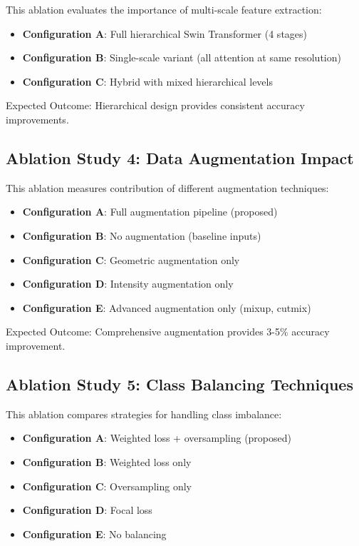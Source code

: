 This ablation evaluates the importance of multi-scale feature extraction:

\begin{itemize}
    \item \textbf{Configuration A}: Full hierarchical Swin Transformer (4 stages)
    \item \textbf{Configuration B}: Single-scale variant (all attention at same resolution)
    \item \textbf{Configuration C}: Hybrid with mixed hierarchical levels
\end{itemize}

Expected Outcome: Hierarchical design provides consistent accuracy improvements.

\subsection{Ablation Study 4: Data Augmentation Impact}

This ablation measures contribution of different augmentation techniques:

\begin{itemize}
    \item \textbf{Configuration A}: Full augmentation pipeline (proposed)
    \item \textbf{Configuration B}: No augmentation (baseline inputs)
    \item \textbf{Configuration C}: Geometric augmentation only
    \item \textbf{Configuration D}: Intensity augmentation only
    \item \textbf{Configuration E}: Advanced augmentation only (mixup, cutmix)
\end{itemize}

Expected Outcome: Comprehensive augmentation provides 3-5\% accuracy improvement.

\subsection{Ablation Study 5: Class Balancing Techniques}

This ablation compares strategies for handling class imbalance:

\begin{itemize}
    \item \textbf{Configuration A}: Weighted loss + oversampling (proposed)
    \item \textbf{Configuration B}: Weighted loss only
    \item \textbf{Configuration C}: Oversampling only
    \item \textbf{Configuration D}: Focal loss
    \item \textbf{Configuration E}: No balancing
\end{itemize}

